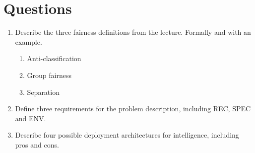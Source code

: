 

\newcommand{\dozenten}{Prof.~Dr.~Steffen Herbold}
\newcommand{\vorlesung}{Principles of AI Engineering}
\newcommand{\docauthor}{Lukas Schulte}
\newcommand{\semester}{}
\newcommand{\blattnummer}{12}
\newcommand{\bistermin}{}


\section*{Questions}

\begin{enumerate}
      \item
            Describe the three fairness definitions from the lecture. Formally and with an example.
            \begin{enumerate}
                  \item Anti-classification
                  \item Group fairness
                  \item Separation
            \end{enumerate}
      \item
            Define three requirements for the problem description, including REC, SPEC and ENV.
      \item
            Describe four possible deployment architectures for intelligence, including pros and cons.
\end{enumerate}


